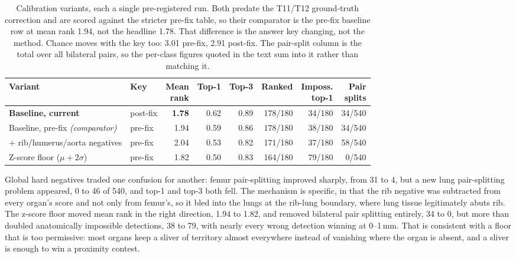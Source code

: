 \documentclass[10pt]{article}
\begin{document}
\begin{table}[!htbp]
\centering
\small
\caption{Calibration variants, each a single pre-registered run. Both predate the
T11/T12 ground-truth correction and are scored against the stricter pre-fix
table, so their comparator is the pre-fix baseline row at mean rank 1.94, not the
headline 1.78. That difference is the answer key changing, not the method. Chance
moves with the key too: 3.01 pre-fix, 2.91 post-fix. The pair-split column is
the total over all bilateral pairs, so the per-class figures quoted in the text
sum into it rather than matching it.}
\label{tab:variants}
\begin{tabular}{@{}llrrrrrr@{}}
\toprule
Variant & Key & \makecell{Mean\\rank} & Top-1 & Top-3 & Ranked & \makecell{Imposs.\\top-1} & \makecell{Pair\\splits} \\
\midrule
\textbf{Baseline, current} & post-fix & \textbf{1.78} & 0.62 & 0.89 & 178/180 & 34/180 & 34/540 \\
Baseline, pre-fix \emph{(comparator)} & pre-fix & 1.94 & 0.59 & 0.86 & 178/180 & 38/180 & 34/540 \\
$+$ rib/humerus/aorta negatives & pre-fix & 2.04 & 0.53 & 0.82 & 171/180 & 37/180 & 58/540 \\
Z-score floor ($\mu + 2\sigma$) & pre-fix & 1.82 & 0.50 & 0.83 & 164/180 & 79/180 & 0/540 \\
\bottomrule
\end{tabular}
\end{table}

Global hard negatives traded one confusion for another: femur pair-splitting
improved sharply, from 31 to 4, but a new lung pair-splitting problem appeared, 0
to 46 of 540, and top-1 and top-3 both fell. The mechanism is specific, in that the
rib negative was subtracted from every organ's score and not only from femur's, so
it bled into the lungs at the rib-lung boundary, where lung tissue legitimately
abuts rib. The z-score floor moved mean rank in the right direction, 1.94 to 1.82,
and removed bilateral pair splitting entirely, 34 to 0, but more than doubled
anatomically impossible detections, 38 to 79, with nearly every wrong detection
winning at 0--1\,mm. That is consistent with a floor that is too permissive: most
organs keep a sliver of territory almost everywhere instead of vanishing where the
organ is absent, and a sliver is enough to win a proximity contest.
\end{document}
